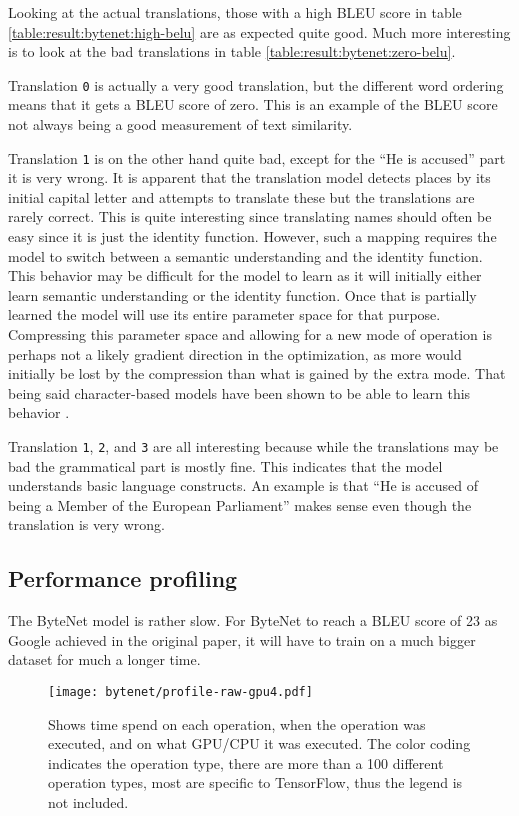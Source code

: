Looking at the actual translations, those with a high BLEU score in table \ref{table:result:bytenet:high-belu} are as expected quite good. Much more interesting is to look at the bad translations in table \ref{table:result:bytenet:zero-belu}.

Translation \texttt{0} is actually a very good translation, but the different word ordering means that it gets a BLEU score of zero. This is an example of the BLEU score not always being a good measurement of text similarity.

Translation \texttt{1} is on the other hand quite bad, except for the ``He is accused'' part it is very wrong. It is apparent that the translation model detects places by its initial capital letter and attempts to translate these but the translations are rarely correct. This is quite interesting since translating names should often be easy since it is just the identity function. However, such a mapping requires the model to switch between a semantic understanding and the identity function. This behavior may be difficult for the model to learn as it will initially either learn semantic understanding or the identity function. Once that is partially learned the model will use its entire parameter space for that purpose. Compressing this parameter space and allowing for a new mode of operation is perhaps not a likely gradient direction in the optimization, as more would initially be lost by the compression than what is gained by the extra mode. That being said character-based models have been shown to be able to learn this behavior \cite{character-alignment}.

Translation \texttt{1}, \texttt{2}, and \texttt{3} are all interesting because while the translations may be bad the grammatical part is mostly fine. This indicates that the model understands basic language constructs. An example is that ``He is accused of being a Member of the European Parliament'' makes sense even though the translation is very wrong.

\clearpage
\subsection{Performance profiling}
The ByteNet model is rather slow. For ByteNet to reach a BLEU score of 23 as Google achieved in the original paper, it will have to train on a much bigger dataset for much a longer time.

\begin{figure}[h]
    \centering
    \texttt{[image: bytenet/profile-raw-gpu4.pdf]}
    \caption{Shows time spend on each operation, when the operation was executed, and on what GPU/CPU it was executed. The color coding indicates the operation type, there are more than a 100 different operation types, most are specific to TensorFlow, thus the legend is not included.}
    \label{fig:result:bytenet:profile-raw}
\end{figure}


